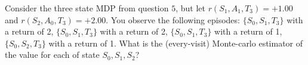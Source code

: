 Consider the three state MDP from question $5$, but let $r(S_1, A_1,T_{3}) = +1.00$ and $r( S_{2}, A_{0},T_{3})=+2.00$.
You observe the following episodes:
$\{S_{0}, S_{1} , T_{3}\}$ with a return of 2, $\{S_{0}, S_{1} , T_{3}\}$ with a return of 2, $\{S_{0}, S_{1} , T_{3}\}$ with a return of 1, $\{S_{0}, S_{2} , T_{3}\}$ with a return of 1.
What is the (every-visit) Monte-carlo estimator of the value for each of state $S_{0}, S_{1}, S_{2}$?

